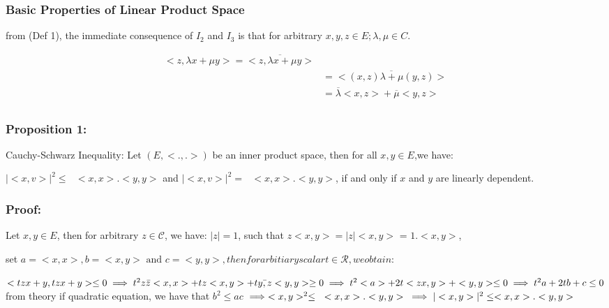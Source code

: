 \documentclass[12pt]{article}
\begin{document}
\subsubsection*{Basic Properties of Linear Product Space}
from (Def 1), the immediate consequence of $I_{2}$ and $I_{3}$ is that for arbitrary $x,y,z \in E; \lambda, \mu \in C$.

\begin{eqnarray*}
    \biggl<z, \lambda x + \mu y\biggr> = \overline{\biggl<z, \lambda x + \mu y \biggr>} \\
    &= \overline{\biggl<(x,z)\lambda + \mu (y,z) \biggr>} \\
    &= \overline{\lambda} \biggl<x,z\biggr> + \overline{\mu} \biggl<y,z\biggr> \\
\end{eqnarray*}

\subsubsection*{Proposition 1:}
Cauchy-Schwarz Inequality: Let $(E,<.,.>)$ be an inner product space, then for all $x,y \in E$,we have:

$|<x,v>|^2 \leq \text{   } <x,x>.<y,y>$ and 
$|<x,v>|^2 = \text{   } <x,x>.<y,y>$, if and only if $x$ and $y$ are linearly dependent.

\subsubsection*{Proof:}
Let $x,y \in E$, then for arbitrary $z \in \mathcal{C}$, we have:
$|z|=1$, such that $z<x,y> = |z|<x,y>$ = $1.<x,y>$,

set $a = <x,x>, b= <x,y> \text{ and } c=<y,y>, then for arbitiary scalar t \in \mathcal{R}, we obtain:$

\begin{math}
    <tzx+y,tzx+y> \leq 0 \\
    \implies t^2z\bar{z}<x,x> + tz<x,y> + t\bar{y,z}<y,y> \geq 0 \\
    \implies t^2<a> + 2t<zx,y> + <y,y> \leq 0 \\
    \implies t^2a + 2tb + c \leq 0 \\
\end{math}
from theory if quadratic equation, we have that $b^{2} \leq ac$
\begin{math}
    \implies <x,y>^2 \leq \text{  } <x,x>.<y,y> \\
    \implies |<x,y>|^2 \leq <x,x>.<y,y> \\
\end{math}
\end{document}
